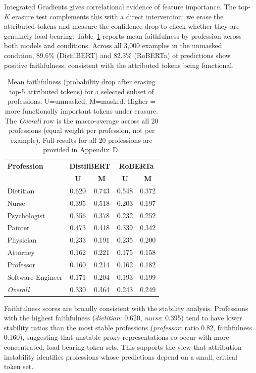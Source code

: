 \documentclass[11pt]{article}
\begin{document}
Integrated Gradients gives correlational evidence of feature
importance. The top-$K$ erasure test complements this with a
direct intervention: we erase the attributed tokens and measure the
confidence drop to check whether they are genuinely load-bearing.
Table~\ref{tab:faithfulness} reports mean faithfulness by profession
across both models and conditions. Across all 3,000 examples in the unmasked condition, 89.6\%
(DistilBERT) and 82.3\% (RoBERTa) of predictions show positive
faithfulness, consistent with the attributed tokens being functional.

\begin{table}[h]
\centering\small
\setlength{\tabcolsep}{4pt}
\begin{tabular}{lcccc}
\toprule
\textbf{Profession} & \multicolumn{2}{c}{\textbf{DistilBERT}} & \multicolumn{2}{c}{\textbf{RoBERTa}} \\
& \textbf{U} & \textbf{M} & \textbf{U} & \textbf{M} \\
\midrule
Dietitian         & 0.620 & 0.743 & 0.548 & 0.372 \\
Nurse             & 0.395 & 0.518 & 0.203 & 0.197 \\
Psychologist      & 0.356 & 0.378 & 0.232 & 0.252 \\
Painter           & 0.473 & 0.418 & 0.339 & 0.342 \\
Physician         & 0.233 & 0.191 & 0.235 & 0.200 \\
Attorney          & 0.162 & 0.221 & 0.175 & 0.158 \\
Professor         & 0.160 & 0.214 & 0.162 & 0.182 \\
Software Engineer & 0.171 & 0.204 & 0.193 & 0.199 \\
\midrule
\textit{Overall}  & 0.330 & 0.364 & 0.243 & 0.249 \\
\bottomrule
\end{tabular}
\caption{Mean faithfulness (probability drop after erasing top-5
attributed tokens) for a selected subset of professions.
U=unmasked; M=masked. Higher = more functionally important tokens
under erasure. The \textit{Overall} row is the macro-average across
all 20 professions (equal weight per profession, not per example).
Full results for all 20 professions are provided in Appendix~D.}
\label{tab:faithfulness}
\end{table}

Faithfulness scores are broadly consistent with the stability analysis.
Professions with the highest faithfulness (\emph{dietitian}: 0.620,
\emph{nurse}: 0.395) tend to have lower stability ratios than the most
stable professions (\emph{professor}: ratio 0.82, faithfulness 0.160),
suggesting that unstable proxy representations co-occur with more
concentrated, load-bearing token sets. This supports the view that attribution instability identifies
professions whose predictions depend on a small, critical token set.
\end{document}
